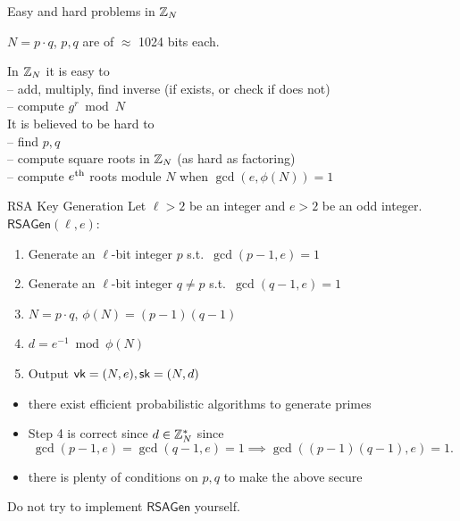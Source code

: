 \documentclass[usenames,dvipsnames, 9pt]{beamer}
\begin{document}
\begin{frame}{Easy and hard problems in ${{\mathbb Z}}_N$}
\Large 
\begin{center}
{\color{Orange}  $N = p \cdot q$},  $p, q$ are of $\approx$ 1024 bits each.\\
\end{center}
	In ${{\mathbb Z}}_N$ it is  {\color{Orange} easy} to \\[5pt]
	-- add, multiply, find inverse (if exists, or check if does not)\\
	--  compute $g^r \bmod N$ \\[14pt]
	It is {\color{Orange} believed to be  hard} to \\[5pt]
	 -- find $p, q$ \\
	 -- compute square roots in ${{\mathbb Z}}_N$ (as hard as factoring) \\
	 -- compute $e^{\mathrm{th}}$ roots module $N$ when $\gcd(e, \phi(N)) = 1$\\
\end{frame}

\begin{frame}{RSA Key Generation}
\Large
Let $\ell>2$ be an integer and $e>2$ be an odd integer. \\[8pt]
{\color{Orange} $\mathsf{RSAGen}(\ell, e):$}
\begin{enumerate}
	\itemsep5pt
	\item Generate an $\ell$-bit integer $p$ s.t.\ $\gcd(p-1, e)=1$
	\item Generate an $\ell$-bit integer $q \neq p$ s.t.\ $\gcd(q-1, e)=1$
	\item $N= p \cdot q$, $\phi(N) = (p-1)(q-1)$
	\item $d = e^{-1} \bmod \phi(N)$
	\item Output $\textsf{vk} = (N, e), \textsf{sk}=(N, d)$
\end{enumerate}
\vspace{10pt}
\large
\pause
\begin{itemize}
	\item there exist efficient probabilistic algorithms to generate primes
	\item Step 4 is correct since $d \in {{\mathbb Z}}_N^\ast$ since \[\gcd(p-1, e) = \gcd(q-1, e) = 1 \implies \gcd((p-1)(q-1), e)=1.\]
	\item there is plenty of conditions on $p,q$ to make the above secure
\end{itemize}
\centering
\Large Do not try to implement $\mathsf{RSAGen}$ yourself. 
\end{frame}
\end{document}
